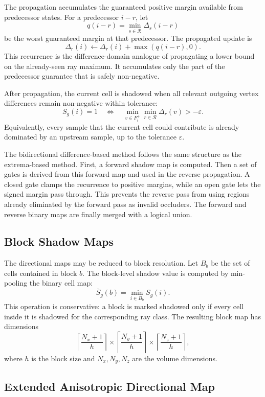 The propagation accumulates the guaranteed positive margin available from
predecessor states.  For a predecessor \(i-r\), let
\[
    q(i-r)=\min_{s\in\mathcal{R}}\Delta_s(i-r)
\]
be the worst guaranteed margin at that predecessor.  The propagated update is
\[
    \Delta_r(i)
    \leftarrow
    \Delta_r(i) + \max(q(i-r),0).
\]
This recurrence is the difference-domain analogue of propagating a lower
bound on the already-seen ray maximum.  It accumulates only the part of the
predecessor guarantee that is safely non-negative.

After propagation, the current cell is shadowed when all relevant outgoing
vertex differences remain non-negative within tolerance:
\[
    S_g(i)=1
    \quad\Longleftrightarrow\quad
    \min_{v\in F_i^+}\min_{r\in\mathcal{R}}\Delta_r(v)
    >
    -\varepsilon.
\]
Equivalently, every sample that the current cell could contribute is already
dominated by an upstream sample, up to the tolerance \(\varepsilon\).

The bidirectional difference-based method follows the same structure as the
extrema-based method.  First, a forward shadow map is computed.  Then a set of
gates is derived from this forward map and used in the reverse propagation.  A
closed gate clamps the recurrence to positive margins, while an open gate lets
the signed margin pass through.  This prevents the reverse pass from using
regions already eliminated by the forward pass as invalid occluders.  The
forward and reverse binary maps are finally merged with a logical union.

\subsection{Block Shadow Maps}

The directional maps may be reduced to block resolution.  Let \(B_b\) be the
set of cells contained in block \(b\).  The block-level shadow value is
computed by min-pooling the binary cell map:
\[
    \bar{S}_g(b)
    =
    \min_{i\in B_b} S_g(i).
\]
This operation is conservative: a block is marked shadowed only if every cell
inside it is shadowed for the corresponding ray class.  The resulting block
map has dimensions
\[
    \left\lceil \frac{N_x+1}{h} \right\rceil
    \times
    \left\lceil \frac{N_y+1}{h} \right\rceil
    \times
    \left\lceil \frac{N_z+1}{h} \right\rceil,
\]
where \(h\) is the block size and \(N_x,N_y,N_z\) are the volume dimensions.

\subsection{Extended Anisotropic Directional Map}

